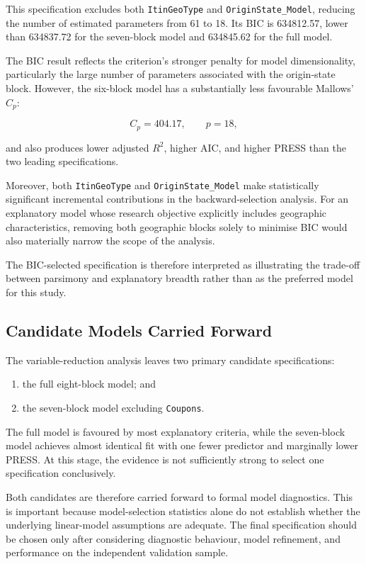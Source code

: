 \documentclass[11pt,a4paper]{article}
\begin{document}
This specification excludes both \texttt{ItinGeoType} and \texttt{OriginState\_Model}, reducing the number of estimated parameters from 61 to 18. Its BIC is 634812.57, lower than 634837.72 for the seven-block model and 634845.62 for the full model.

The BIC result reflects the criterion's stronger penalty for model dimensionality, particularly the large number of parameters associated with the origin-state block. However, the six-block model has a substantially less favourable Mallows' \(C_p\):

\[
C_p = 404.17,
\qquad
p = 18,
\]

and also produces lower adjusted \(R^2\), higher AIC, and higher PRESS than the two leading specifications.

Moreover, both \texttt{ItinGeoType} and \texttt{OriginState\_Model} make statistically significant incremental contributions in the backward-selection analysis. For an explanatory model whose research objective explicitly includes geographic characteristics, removing both geographic blocks solely to minimise BIC would also materially narrow the scope of the analysis.

The BIC-selected specification is therefore interpreted as illustrating the trade-off between parsimony and explanatory breadth rather than as the preferred model for this study.

\subsection{Candidate Models Carried Forward}

The variable-reduction analysis leaves two primary candidate specifications:

\begin{enumerate}
    \item the full eight-block model; and
    \item the seven-block model excluding \texttt{Coupons}.
\end{enumerate}

The full model is favoured by most explanatory criteria, while the seven-block model achieves almost identical fit with one fewer predictor and marginally lower PRESS. At this stage, the evidence is not sufficiently strong to select one specification conclusively.

Both candidates are therefore carried forward to formal model diagnostics. This is important because model-selection statistics alone do not establish whether the underlying linear-model assumptions are adequate. The final specification should be chosen only after considering diagnostic behaviour, model refinement, and performance on the independent validation sample.
\end{document}
